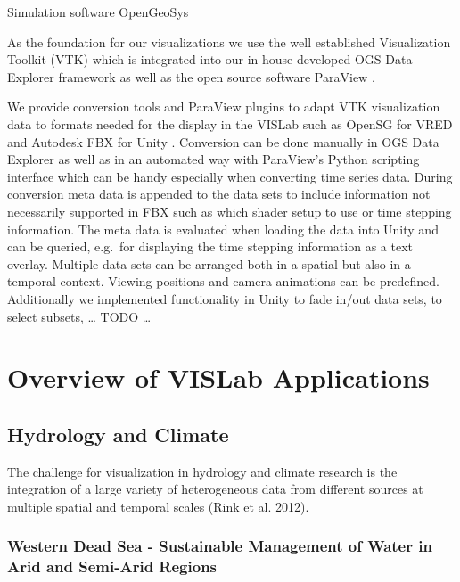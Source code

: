 Simulation software OpenGeoSys \cite{kolditz:ogs}

As the foundation for our visualizations we use the well established
Visualization Toolkit (VTK) \cite{will-schroeder:06} which is
integrated into our in-house developed OGS Data Explorer framework
\cite{rink:eesenvirvis} as well as the open source software ParaView
\cite{squillacote:08}.

We provide conversion tools and ParaView plugins to adapt VTK
visualization data to formats needed for the display in the VISLab such
as OpenSG for VRED \cite{bilke:vtkosgconverter} and Autodesk FBX for
Unity \cite{bilke:vtkfbxconverter}. Conversion can be done manually in
OGS Data Explorer as well as in an automated way with ParaView's Python
scripting interface which can be handy especially when converting time
series data. During conversion meta data is appended to the data sets to
include information not necessarily supported in FBX such as which
shader setup to use or time stepping information. The meta data is
evaluated when loading the data into Unity and can be queried, e.g.~for
displaying the time stepping information as a text overlay. Multiple
data sets can be arranged both in a spatial but also in a temporal
context. Viewing positions and camera animations can be predefined.
Additionally we implemented functionality in Unity to fade in/out data
sets, to select subsets, \ldots{} TODO \ldots{}

\section{Overview of VISLab Applications}
\label{overview-of-vislab-applications}

\subsection{Hydrology and Climate}
\label{hydrology-and-climate}

The challenge for visualization in hydrology and climate research is the
integration of a large variety of heterogeneous data from different
sources at multiple spatial and temporal scales (Rink et al. 2012).

\subsubsection{Western Dead Sea - Sustainable Management of Water in Arid and Semi-Arid
Regions}
\label{western-dead-sea---sustainable-management-of-water-in-arid-and-semi-arid-regions}

